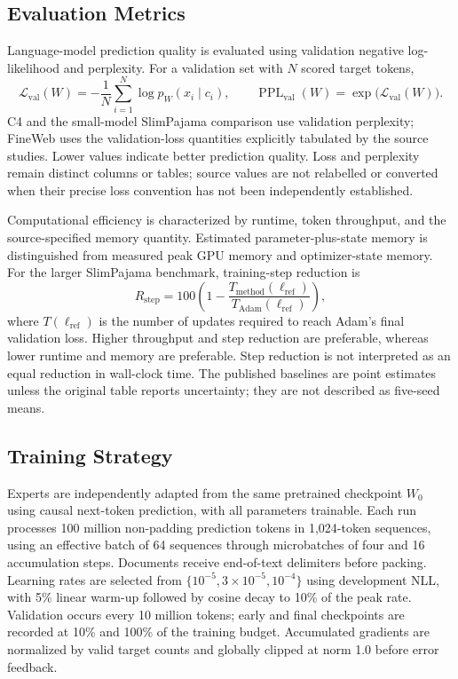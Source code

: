 \documentclass[fleqn,10pt]{wlscirep}
\begin{document}
\subsection{Evaluation Metrics}
\label{subsec:evaluation_metrics}
Language-model prediction quality is evaluated using validation
negative log-likelihood and perplexity. For a validation set with
$N$ scored target tokens,
\begin{equation}
\mathcal L_{\mathrm{val}}(W)
=-\frac{1}{N}\sum_{i=1}^{N}\log p_W(x_i\mid c_i),
\qquad
\operatorname{PPL}_{\mathrm{val}}(W)
=\exp\!\bigl(\mathcal L_{\mathrm{val}}(W)\bigr).
\end{equation}
C4 and the small-model SlimPajama comparison use validation perplexity;
FineWeb uses the validation-loss quantities explicitly tabulated by
the source studies. Lower values indicate better prediction quality.
Loss and perplexity remain distinct columns or tables; source values
are not relabelled or converted when their precise loss convention
has not been independently established.

Computational efficiency is characterized by runtime, token throughput,
and the source-specified memory quantity. Estimated parameter-plus-state
memory is distinguished from measured peak GPU memory and optimizer-state
memory. For the larger SlimPajama benchmark, training-step reduction is
\begin{equation}
R_{\mathrm{step}}=100\left(1-\frac{T_{\mathrm{method}}(\ell_{\mathrm{ref}})}
{T_{\mathrm{Adam}}(\ell_{\mathrm{ref}})}\right),
\end{equation}
where $T(\ell_{\mathrm{ref}})$ is the number of updates required to reach
Adam's final validation loss. Higher throughput and step reduction are
preferable, whereas lower runtime and memory are preferable. Step
reduction is not interpreted as an equal reduction in wall-clock time.
The published baselines are point estimates unless the original table
reports uncertainty; they are not described as five-seed means.



\subsection{Training Strategy}
\label{subsec:training_strategy}

Experts are independently adapted from the same pretrained
checkpoint $W_0$ using causal next-token prediction, with all
parameters trainable. Each run processes 100 million non-padding
prediction tokens in 1,024-token sequences, using an effective
batch of 64 sequences through microbatches of four and 16
accumulation steps. Documents receive end-of-text delimiters
before packing. Learning rates are selected from
$\{10^{-5},3\times10^{-5},10^{-4}\}$ using development NLL,
with 5\% linear warm-up followed by cosine decay to 10\% of
the peak rate. Validation occurs every 10 million tokens;
early and final checkpoints are recorded at 10\% and 100\%
of the training budget. Accumulated gradients are normalized
by valid target counts and globally clipped at norm 1.0
before error feedback.
\end{document}
